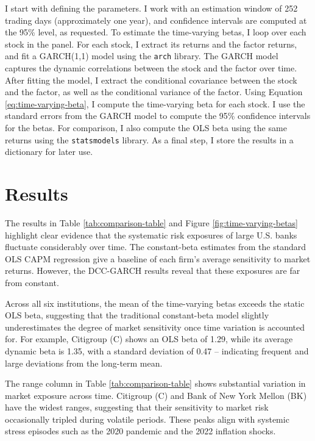 \documentclass[10pt,parskip=half]{scrartcl}
\numberwithin{equation}{section} %
\numberwithin{figure}{section}   %
\numberwithin{table}{section}    %
\begin{document}
I start with defining the parameters.
I work with an estimation window of 252 trading days (approximately one year), and confidence intervals are computed at the 95\% level, as requested.
To estimate the time-varying betas, I loop over each stock in the panel.
For each stock, I extract its returns and the factor returns, and fit a GARCH(1,1) model using the \texttt{arch} library.
The GARCH model captures the dynamic correlations between the stock and the factor over time.
After fitting the model, I extract the conditional covariance between the stock and the factor, as well as the conditional variance of the factor.
Using Equation \ref{eq:time-varying-beta}, I compute the time-varying beta for each stock.
I use the standard errors from the GARCH model to compute the 95\% confidence intervals for the betas.
For comparison, I also compute the OLS beta using the same returns using the \texttt{statsmodels} library.
As a final step, I store the results in a dictionary for later use.


\section{Results}
\vspace{-1em}

The results in Table \ref{tab:comparison-table} and Figure \ref{fig:time-varying-betas} highlight clear evidence that the systematic risk exposures of large U.S. banks fluctuate considerably over time.
The constant-beta estimates from the standard OLS CAPM regression give a baseline of each firm's average sensitivity to market returns.
However, the DCC-GARCH results reveal that these exposures are far from constant.

Across all six institutions, the mean of the time-varying betas exceeds the static OLS beta, suggesting that the traditional constant-beta model slightly underestimates the degree of market sensitivity once time variation is accounted for.
For example, Citigroup (C) shows an OLS beta of 1.29, while its average dynamic beta is 1.35, with a standard deviation of 0.47 – indicating frequent and large deviations from the long-term mean.

The range column in Table \ref{tab:comparison-table} shows substantial variation in market exposure across time.
Citigroup (C) and Bank of New York Mellon (BK) have the widest ranges, suggesting that their sensitivity to market risk occasionally tripled during volatile periods.
These peaks align with systemic stress episodes such as the 2020 pandemic and the 2022 inflation shocks.
\end{document}
